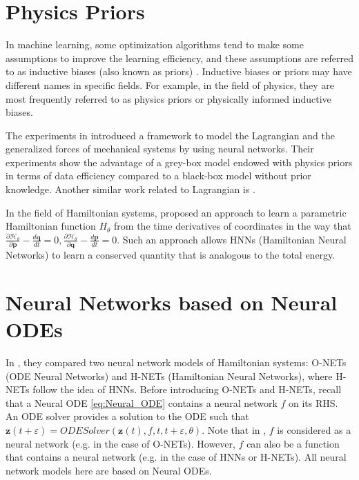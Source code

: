 \documentclass[
	parskip, 			   %
	twoside, 			   %
	DIV=14, 			   %
	BCOR=15.0mm, 		   %
	headsepline, 		   %
	open=right, 		   %
	captions=tableheading, %
	bibliography=totoc,    %
	numbers=noenddot       %
]{scrreprt}
\begin{document}
\section{Physics Priors}
In machine learning, some optimization algorithms tend to make some assumptions to improve the learning efficiency, and these assumptions are referred to as inductive biases (also known as priors) \cite{mitchell1997machine}. Inductive biases or priors may have different names in specific fields. For example, in the field of physics, they are most frequently referred to as physics priors or physically informed inductive biases.

The experiments in \cite{gupta2019general} introduced a framework to model the Lagrangian and the generalized forces of mechanical systems by using neural networks. Their experiments show the advantage of a grey-box model endowed with physics priors in terms of data efficiency compared to a black-box model without prior knowledge. Another similar work related to Lagrangian is \cite{lutter2019deep}.

In the field of Hamiltonian systems, \cite{greydanus2019hamiltonian} proposed an approach to learn a parametric Hamiltonian function $H_{\theta}$ from the time derivatives of coordinates in the way that $\frac{\partial \mathcal{H}_{\theta}}{\partial \mathbf{p}} - \frac{d\mathbf{q}}{dt} = 0, \frac{\partial \mathcal{H}_{\theta}}{\partial \mathbf{q}} - \frac{d\mathbf{p}}{dt} = 0 $. Such an approach allows HNNs (Hamiltonian Neural Networks) to learn a conserved quantity that is analogous to the total energy.

\section{Neural Networks based on Neural ODEs}
In \cite{chen2019symplectic}, they compared two neural network models of Hamiltonian systems: O-NETs (ODE Neural Networks) and H-NETs (Hamiltonian Neural Networks), where H-NETs follow the idea of HNNs. 
Before introducing O-NETs and H-NETs, recall that a Neural ODE \ref{eq:Neural_ODE} contains a neural network $f$ on its RHS. An ODE solver provides a solution to the ODE such that $\mathbf{z}(t+\varepsilon) = ODESolver(\mathbf{z}(t), f, t, t+\varepsilon , \theta)$. Note that in \cite{chen2019symplectic}, $f$ is considered as a neural network (e.g. in the case of O-NETs). However, $f$ can also be a function that contains a neural network (e.g. in the case of HNNs or H-NETs). All neural network models here are based on Neural ODEs.
\end{document}
